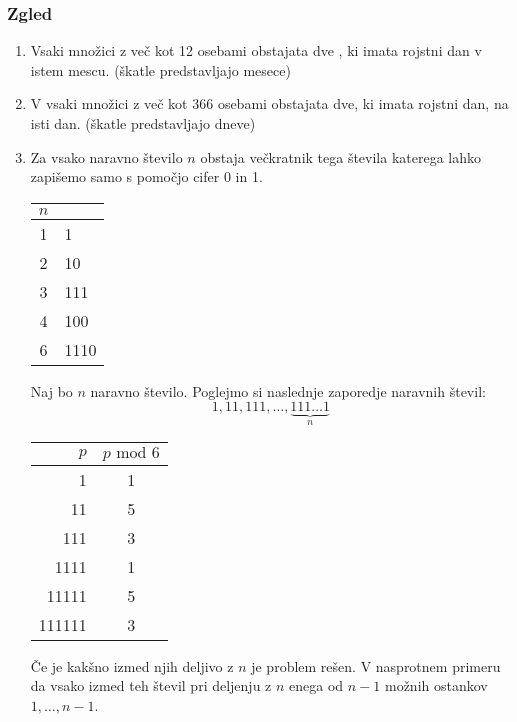 \subsubsection{Zgled}
\begin{enumerate}[label=\roman*.]
    \item Vsaki množici z več kot 12 osebami obstajata dve , ki imata rojstni dan v istem mescu. (škatle predstavljajo mesece)
    \item V vsaki množici z več kot 366 osebami obstajata dve, ki imata rojstni dan, na isti dan. (škatle predstavljajo dneve)
    \item Za vsako naravno število $n$ obstaja večkratnik tega števila katerega lahko zapišemo samo s pomočjo cifer 0 in 1. \\[1em]
    \begin{center}
        \begin{tabular}{c|l}
            $n$ &  \\  
            \hline
            1 & 1 \\
            \hline
            2 & 10 \\ 
            \hline
            3 & 111 \\
            \hline
            4 & 100 \\
            \hline
            6 & 1110
        \end{tabular}
    \end{center}
    Naj bo $n$ naravno število. Poglejmo si naslednje zaporedje naravnih števil:
    $$
    1, 11, 111, \dots, \underset{n}{\underbrace{111\ldots 1}}
    $$
    \begin{center}
        \begin{tabular}{r|c}
            $p$ & $p \text{ mod } 6$ \\  
            \hline
            1 & 1 \\
            \hline
            11 & 5 \\ 
            \hline
            111 & 3 \\
            \hline
            1111 & 1 \\
            \hline
            11111 & 5 \\
            \hline
            111111 & 3 \\
        \end{tabular}
    \end{center}
    Če je kakšno izmed njih deljivo z $n$ je problem rešen. V nasprotnem primeru da vsako izmed teh števil pri deljenju z $n$ enega od $n - 1$ možnih ostankov $1, \dots, n - 1$. \\

\end{enumerate}
